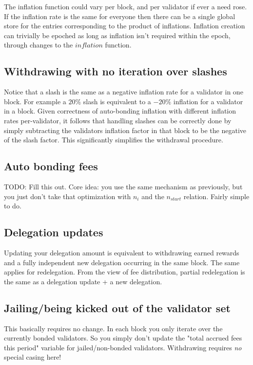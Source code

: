 \documentclass[]{article}
\begin{document}
The inflation function could vary per block,
and per validator if ever a need rose. 
If the inflation rate is the same for everyone then there can be a single global store for the entries corresponding to the product of inflations.
Inflation creation can trivially be epoched as long as inflation isn't required within the epoch, through changes to the $inflation$ function.

\subsection{Withdrawing with no iteration over slashes}
Notice that a slash is the same as a negative inflation rate for a validator in one block.
For example a $20\%$ slash is equivalent to a $-20\%$ inflation for a validator in a block.
Given correctness of auto-bonding inflation with different inflation rates per-validator,
it follows that handling slashes can be correctly done by simply subtracting the validators inflation factor in that block to be the negative of the slash factor.
This significantly simplifies the withdrawal procedure.

\subsection{Auto bonding fees}
TODO: Fill this out. 
Core idea: you use the same mechanism as previously, but you just don't take that optimization with $n_{i}$ and the $n_{start}$ relation.
Fairly simple to do.

\subsection{Delegation updates}
Updating your delegation amount is equivalent to withdrawing earned rewards and a fully independent new delegation occurring in the same block.
The same applies for redelegation.
From the view of fee distribution, partial redelegation is the same as a delegation update + a new delegation.

\subsection{Jailing/being kicked out of the validator set}
This basically requires no change.
In each block you only iterate over the currently bonded validators.
So you simply don't update the "total accrued fees this period" variable for jailed/non-bonded validators.
Withdrawing requires \textit{no} special casing here!
\end{document}
